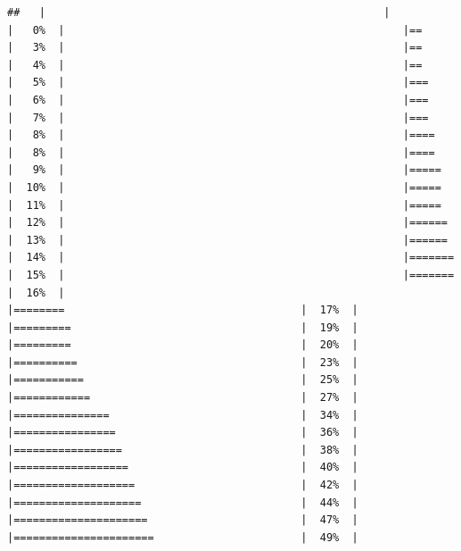\documentclass[
  krantz2]{krantz}
\begin{document}
\begin{verbatim}
##   |                                                     |                                             |   0%  |                                                     |==                                           |   3%  |                                                     |==                                           |   4%  |                                                     |==                                           |   5%  |                                                     |===                                          |   6%  |                                                     |===                                          |   7%  |                                                     |===                                          |   8%  |                                                     |====                                         |   8%  |                                                     |====                                         |   9%  |                                                     |=====                                        |  10%  |                                                     |=====                                        |  11%  |                                                     |=====                                        |  12%  |                                                     |======                                       |  13%  |                                                     |======                                       |  14%  |                                                     |=======                                      |  15%  |                                                     |=======                                      |  16%  |                                                     |========                                     |  17%  |                                                     |=========                                    |  19%  |                                                     |=========                                    |  20%  |                                                     |==========                                   |  23%  |                                                     |===========                                  |  25%  |                                                     |============                                 |  27%  |                                                     |===============                              |  34%  |                                                     |================                             |  36%  |                                                     |=================                            |  38%  |                                                     |==================                           |  40%  |                                                     |===================                          |  42%  |                                                     |====================                         |  44%  |                                                     |=====================                        |  47%  |                                                     |======================                       |  49%  |         
\end{verbatim}
\end{document}
